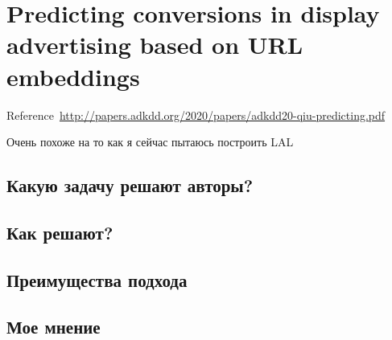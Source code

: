 \chapter{Predicting conversions in display advertising based on URL embeddings}
Reference~\url{http://papers.adkdd.org/2020/papers/adkdd20-qiu-predicting.pdf}

Очень похоже на то как я сейчас пытаюсь построить LAL

\section{Какую задачу решают авторы?}

\section{Как решают?}

\section{Преимущества подхода}

\section{Мое мнение}